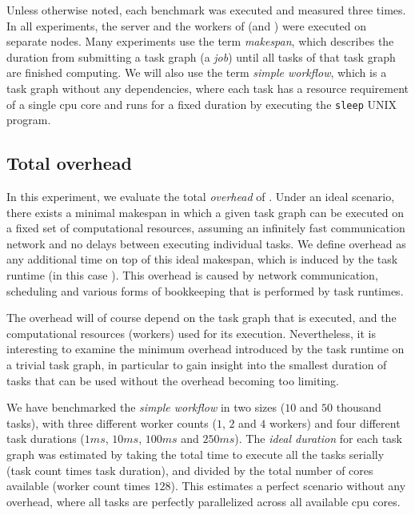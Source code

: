 Unless otherwise noted, each benchmark was executed and measured three times. In all experiments,
the server and the workers of \hyperqueue{} (and \dask{}) were executed on separate nodes. Many
experiments use the term \emph{makespan}, which describes the duration from submitting a
task graph (a \hyperqueue{} \emph{job}) until all tasks of that task graph
are finished computing. We will also use the term \emph{simple workflow}, which is a task graph
without any dependencies, where each task has a resource requirement of a single
\gls{cpu} core and runs for a fixed duration by executing the \texttt{sleep}
UNIX program.

\subsection{Total overhead}
\label{sec:hq-exp-total-overhead}
In this experiment, we evaluate the total \emph{overhead} of \hyperqueue{}. Under
an ideal scenario, there exists a minimal makespan in which a given task graph can be executed on a
fixed set of computational resources, assuming an infinitely fast communication network and no
delays between executing individual tasks. We define overhead as any additional time on top of this
ideal makespan, which is induced by the task runtime (in this case \hyperqueue{}). This
overhead is caused by network communication, scheduling and various forms of bookkeeping that is
performed by task runtimes.

The overhead will of course depend on the task graph that is executed, and the computational
resources (workers) used for its execution. Nevertheless, it is interesting to examine the minimum
overhead introduced by the task runtime on a trivial task graph, in particular to gain insight into
the smallest duration of tasks that can be used without the overhead becoming too limiting.

We have benchmarked the \emph{simple workflow} in two sizes ($10$ and
$50$ thousand tasks), with three different worker counts ($1$,
$2$ and $4$ workers) and four different task durations
($1ms$, $10ms$, $100ms$ and
$250ms$). The \emph{ideal duration} for each task graph was estimated by taking
the total time to execute all the tasks serially (task count times task duration), and divided by
the total number of cores available (worker count times $128$). This estimates a
perfect scenario without any overhead, where all tasks are perfectly parallelized across all
available \gls{cpu} cores.

